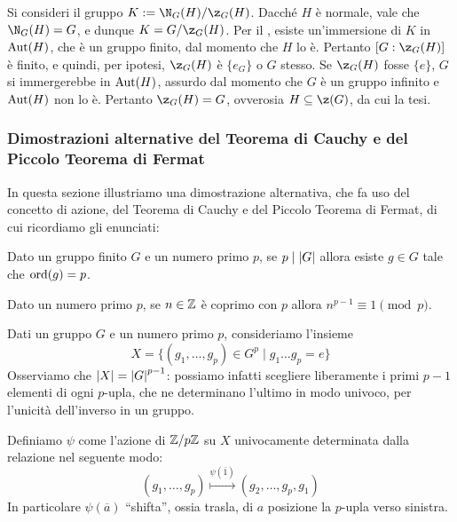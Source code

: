 \documentclass[11pt]{scrartcl}
\begin{document}
	\begin{soln}
		Si consideri il gruppo $K := \N_G(H)/\z_G(H)$. Dacché $H$ è normale,
		vale che $\N_G(H) = G$, e dunque $K = G/\z_G(H)$.
		Per il , esiste un'immersione di $K$ in $\operatorname{Aut}(H)$, che
		è un gruppo finito, dal momento che $H$ lo è. Pertanto $[G : \z_G(H)]$ è
		finito, e quindi, per ipotesi, $\z_G(H)$ è $\{e_G\}$ o $G$ stesso.
		Se $\z_G(H)$ fosse $\{e\}$, $G$ si immergerebbe in
		$\operatorname{Aut}(H)$, assurdo dal momento che $G$ è un gruppo infinito e
		$\operatorname{Aut}(H)$ non lo è. Pertanto
		$\z_G(H) = G$, ovverosia $H \subseteq \z(G)$, da cui la tesi.
	\end{soln}
	
	\subsubsection{Dimostrazioni alternative del Teorema di Cauchy e del Piccolo Teorema di Fermat}
	
	In questa sezione illustriamo una dimostrazione alternativa, che fa uso del concetto di
	azione, del Teorema di Cauchy e del Piccolo
	Teorema di Fermat, di cui ricordiamo gli enunciati:
	
	\begin{theorem}
		\label{teorema1.44}
		Dato un gruppo finito $G$ e un numero primo $p$, se $p \mid \left\lvert G \right\rvert$ allora esiste 
		$g \in G$ tale che $\operatorname{ord}(g) = p$.
	\end{theorem}
	
	\begin{theorem}
		\label{teorema1.45}
		Dato un numero primo $p$, se $n \in \mathbb Z$ è coprimo con $p$ allora 
		$n^{p - 1} \equiv 1 \pmod p$.
	\end{theorem}
	
	Dati un gruppo $G$ e un numero primo $p$, consideriamo l'insieme 
	\[
	X = \{(g_1, \ldots, g_p) \in G^p\mid g_1\ldots g_p = e\}
	\]
	Osserviamo che $\left\lvert X \right\rvert = \left\lvert G \right\rvert^{p - 1}$: possiamo infatti scegliere liberamente
	i primi $p - 1$ elementi di ogni $p$-upla, che ne determinano l'ultimo in 
	modo univoco, per l'unicità dell'inverso in un gruppo. \medskip
	
	
	Definiamo $\psi$ come l'azione di ${\mathbb Z}/p{\mathbb Z}$ su $X$ univocamente determinata dalla relazione
	nel seguente modo:
	\[
	(g_1, \ldots, g_p) \overset{\psi(\overline{1})}{\mapsto} (g_2, \ldots, g_p, g_1)
	\]
	In particolare $\psi(\overline{a})$ ``shifta'', ossia trasla, di $a$ posizione
	la $p$-upla verso sinistra. \medskip
	
\end{document}
